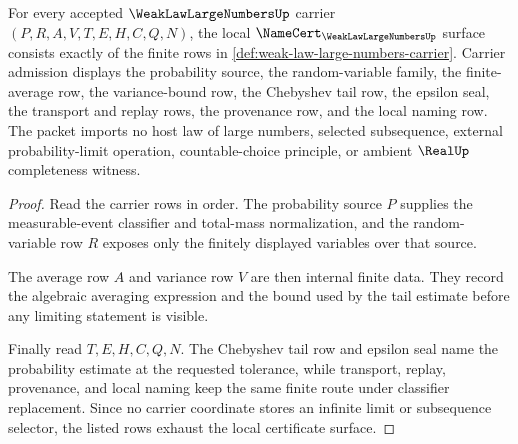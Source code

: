 \begin{theorem}\label{thm:weak-law-large-numbers-namecert-obligations}
For every accepted $\WeakLawLargeNumbersUp$ carrier $(P,R,A,V,T,E,H,C,Q,N)$, the local $\NameCert_{\WeakLawLargeNumbersUp}$ surface consists exactly of the finite rows in \autoref{def:weak-law-large-numbers-carrier}. Carrier admission displays the probability source, the random-variable family, the finite-average row, the variance-bound row, the Chebyshev tail row, the epsilon seal, the transport and replay rows, the provenance row, and the local naming row. The packet imports no host law of large numbers, selected subsequence, external probability-limit operation, countable-choice principle, or ambient $\RealUp$ completeness witness.
\end{theorem}
\begin{proof}
Read the carrier rows in order. The probability source $P$ supplies the measurable-event classifier and total-mass normalization, and the random-variable row $R$ exposes only the finitely displayed variables over that source.

The average row $A$ and variance row $V$ are then internal finite data. They record the algebraic averaging expression and the bound used by the tail estimate before any limiting statement is visible.

Finally read $T,E,H,C,Q,N$. The Chebyshev tail row and epsilon seal name the probability estimate at the requested tolerance, while transport, replay, provenance, and local naming keep the same finite route under classifier replacement. Since no carrier coordinate stores an infinite limit or subsequence selector, the listed rows exhaust the local certificate surface.
\end{proof}

